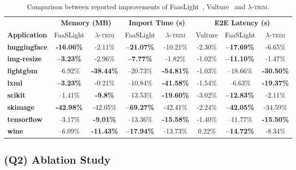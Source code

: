 \documentclass[sigplan,screen]{acmart}
\newcommand{\sys}{\textsc{\ensuremath{\lambda}-trim}\xspace}
\newcommand{\application}[1]{{\textcolor{pennblue}{\textbf{#1}}}}
\begin{document}
\begin{table}[t]
\centering
\scriptsize
\setlength{\tabcolsep}{2pt}
\begin{tabularx}{\columnwidth}{Xccccccc}
\toprule
& \multicolumn{2}{c}{\textbf{Memory (MB)}} & \multicolumn{2}{c}{\textbf{Import Time (s)}} & \multicolumn{3}{c}{\textbf{E2E Latency (s)}} \\
\cmidrule(lr){2-3} \cmidrule(lr){4-5} \cmidrule(lr){6-8}
\textbf{Application} & FaaSLight & \sys & FaaSLight & \sys & Vulture & FaaSLight & \sys \\
\midrule
\application{huggingface}        & \textbf{-16.06\%} & -2.11\%  & \textbf{–21.07\%} & -10.21\%        & -2.30\%  & \textbf{–17.69\%} & -6.65\% \\ 
\application{img-resize}       & \textbf{–3.23\%}  &  -2.96\% & \textbf{–7.77\%}  & -1.82\%        &  -1.02\% & \textbf{–11.10\% }      & -1.47\% \\ 
\application{lightgbm}           & –6.92\%  & \textbf{-38.44\%} & –20.73\%          & \textbf{-54.81\%} & -1.03\% & –18.66\% & \textbf{-30.50\%} \\ 
\application{lxml}               & \textbf{–3.23\%}  & -0.21\%  & –10.84\%          & \textbf{-41.58\%} & -1.54\% & –6.63\% & \textbf{-19.37\%} \\ 
\application{scikit}             & –1.41\%  & \textbf{-9.8\%}   & –13.53\%          & \textbf{-19.60\%} & -3.02\% & \textbf{–12.83\%} & -2.11\% \\ 
\application{skimage}            & \textbf{-42.98\%} & -42.05\% & \textbf{–69.27\%} & -42.41\%      & -2.24\%    & \textbf{–42.05\%} & -34.59\% \\ 
\application{tensorflow}         & –3.17\%  & \textbf{-9.01\%}  & –13.36\%          & \textbf{-15.58\%} & -1.40\% & –11.77\% & \textbf{-15.50\%} \\ 
\application{wine}               & –6.09\%  & \textbf{-11.43\%} & \textbf{–17.94\%} & -13.73\%      & 0.22\%    & \textbf{–14.72\%} & -8.34\% \\ 
\bottomrule
\end{tabularx}\caption{Comparison between reported improvements of FaasLight~\cite{faaslight2023}, Vulture~\cite{vulture} and \sys.}
\label{tab:comparison}
\end{table}

%
 


\subsection{(Q2) Ablation Study}
\end{document}
